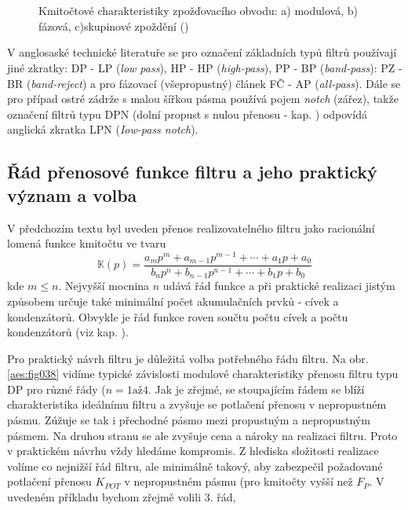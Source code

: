           \begin{figure}[ht!]
            \centering  
                \\
                \\
            \caption{Kmitočtové charakteristiky zpožďovacího obvodu: a) modulová, b) fázová,
                    c)skupinové zpoždění (\cite[s.~36]{HajekSedlacek2002})}
            \label{aes:fig037}
          \end{figure}

          \begin{tcnote}
            V anglosaské technické literatuře se pro označení základních typů filtrů používají jiné
            zkratky: DP - LP (\emph{low pass}), HP - HP (\emph{high-pass}), PP - BP
            (\emph{band-pass}): PZ - BR (\emph{band-reject}) a pro fázovací (všepropustný) článek FČ
            - AP (\emph{all-pass}). Dále se pro případ ostré zádrže s malou šířkou pásma používá
            pojem \emph{notch} (zářez), takže označení filtrů typu DPN (dolní propust s nulou
            přenosu - kap. ) odpovídá anglická zkratka LPN
            (\emph{Iow-pass notch}).            
          \end{tcnote}

    \subsection{Řád přenosové funkce filtru a jeho praktický význam a volba}
      V předchozím textu byl uveden přenos realizovatelného filtru jako racionální lomená funkce
      kmitočtu ve tvaru
      \begin{equation}\label{aes:eq028}
        \mathbb{K}(p) = \frac{a_mp^m + a_{m-1}p^{m-1} + \cdots + a_1p +a_0}
                             {b_np^n + b_{n-1}p^{n-1} + \cdots + b_1p +b_0}
      \end{equation}
      kde \(m\leq n\). Nejvyšší mocnina \(n\) udává řád funkce a při praktické realizaci jistým
      způsobem určuje také minimální počet akumulačních prvků - cívek a kondenzátorů. Obvykle je řád
      funkce roven součtu počtu cívek a počtu kondenzátorů (viz kap. ). 
      
      Pro praktický návrh filtru je důležitá volba potřebného řádu filtru. Na obr. \ref{aes:fig038}
      vidíme typické závislosti modulové charakteristiky přenosu filtru typu DP pro různé řády (\(n
      = 1 \text{až} 4\). Jak je zřejmé, se stoupajícím řádem se blíží charakteristika ideálnímu
      filtru a zvyšuje se potlačení přenosu v nepropustném pásmu. Zúžuje se tak i přechodné pásmo
      mezi propustným a nepropustným pásmem. Na druhou stranu se ale zvyšuje cena a nároky na
      realizaci filtru. Proto v praktickém návrhu vždy hledáme kompromis. Z hlediska složitosti
      realizace volíme co nejnižší řád filtru, ale minimálně takový, aby zabezpečil požadované
      potlačení přenosu \(K_{POT}\) v nepropustném pásmu (pro kmitočty vyšší než \(F_P\). V uvedeném
      příkladu bychom zřejmě volili \num{3}. řád, 

